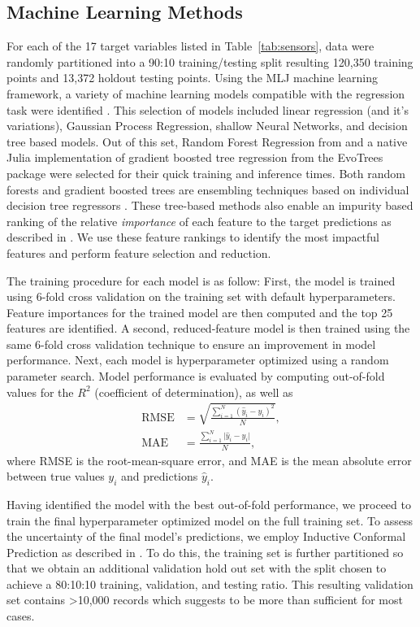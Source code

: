 \documentclass[journal,article,submit,pdftex,moreauthors]{Definitions/mdpi}
\begin{document}
\subsection{Machine Learning Methods}

For each of the 17 target variables listed in Table~\ref{tab:sensors}, data were randomly partitioned into a 90:10 training/testing split resulting 120,350 training points and 13,372 holdout testing points. Using the MLJ machine learning framework, a variety of machine learning models compatible with the regression task were identified \cite{MLJ1}. This selection of models included linear regression (and it's variations), Gaussian Process Regression, shallow Neural Networks, and decision tree based models. Out of this set, Random Forest Regression from \cite{decision-trees} and a native Julia implementation of gradient boosted tree regression from the EvoTrees package were selected for their quick training and inference times. Both random forests and gradient boosted trees are ensembling techniques based on individual decision tree regressors \cite{decision-trees, random-forest, gradient-boosting}. These tree-based methods also enable an impurity based ranking of the relative \textit{importance} of each feature to the target predictions as described in \cite{rfr-orig,rfr-importance-ranking}. We use these feature rankings to identify the most impactful features and perform feature selection and reduction. 

The training procedure for each model is as follow: First, the model is trained using 6-fold cross validation on the training set with default hyperparameters. Feature importances for the trained model are then computed and the top 25 features are identified. A second, reduced-feature model is then trained using the same 6-fold cross validation technique to ensure an improvement in model performance. Next, each model is hyperparameter optimized using a random parameter search. Model performance is evaluated by computing out-of-fold values for the $R^2$ (coefficient of determination), as well as
\begin{align}
    \text{RMSE} &= \sqrt{\frac{\sum\limits_{i=1}^N (\hat{y}_i-y_i)^2}{N}}, \\
    \text{MAE} &= \frac{\sum\limits_{i=1}^N \lvert \hat{y}_i - y_i \vert}{N},
\end{align}
where RMSE is the root-mean-square error, and MAE is the mean absolute error between true values $y_i$ and predictions $\hat{y}_i$.

Having identified the model with the best out-of-fold performance, we proceed to train the final hyperparameter optimized model on the full training set. To assess the uncertainty of the final model's predictions, we employ Inductive Conformal Prediction as described in \cite{conformal-prediction-1, conformal-prediction-2, conformal-prediction-3, conformal-prediction-4}. To do this, the training set is further partitioned so that we obtain an additional validation hold out set with the split chosen to achieve a 80:10:10 training, validation, and testing ratio. This resulting validation set contains >10,000 records which \cite{conformal-prediction-2} suggests to be more than sufficient for most cases. 
\end{document}
